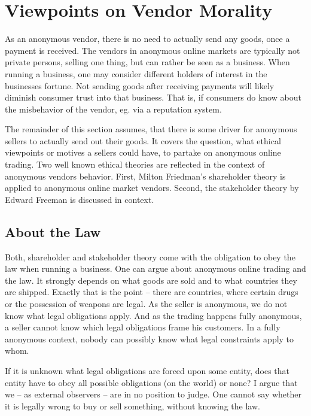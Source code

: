 \section{Viewpoints on Vendor Morality}
\label{vendors}

As an anonymous vendor, there is no need to actually send any goods, once a payment is received. The vendors in anonymous online markets are typically not private persons, selling one thing, but can rather be seen as a business\cite{silkroad2013}. When running a business, one may consider different holders of interest in the businesses fortune. Not sending goods after receiving payments will likely diminish consumer trust into that business. That is, if consumers do know about the misbehavior of the vendor, eg. via a reputation system.

The remainder of this section assumes, that there is some driver for anonymous sellers to actually send out their goods. It covers the question, what ethical viewpoints or motives a sellers could have, to partake on anonymous online trading. Two well known ethical theories are reflected in the context of anonymous vendors behavior. First, Milton Friedman's shareholder theory \cite{shareholder} is applied to anonymous online market vendors. Second, the stakeholder theory by Edward Freeman \cite{stakeholder} is discussed in context.

\subsection{About the Law}

Both, shareholder and stakeholder theory come with the obligation to obey the law when running a business\cite{shareholder, stakeholder}. One can argue about anonymous online trading and the law. It strongly depends on what goods are sold and to what countries they are shipped. Exactly that is the point -- there are countries, where certain drugs or the possession of weapons are legal. As the seller is anonymous, we do not know what legal obligations apply. And as the trading happens fully anonymous, a seller cannot know which legal obligations frame his customers. In a fully anonymous context, nobody can possibly know what legal constraints apply to whom.

If it is unknown what legal obligations are forced upon some entity, does that entity have to obey all possible obligations (on the world) or none? I argue that we -- as external observers -- are in no position to judge. One cannot say whether it is legally wrong to buy or sell something, without knowing the law.

